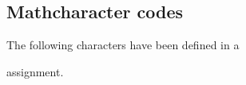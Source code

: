 \documentclass{book}
\begin{document}
\subsection{ Mathcharacter codes}

The following characters have been defined
in a
\begin{disp}
\end{disp}
assignment.
\par\leavevmode\par
\end{document}
